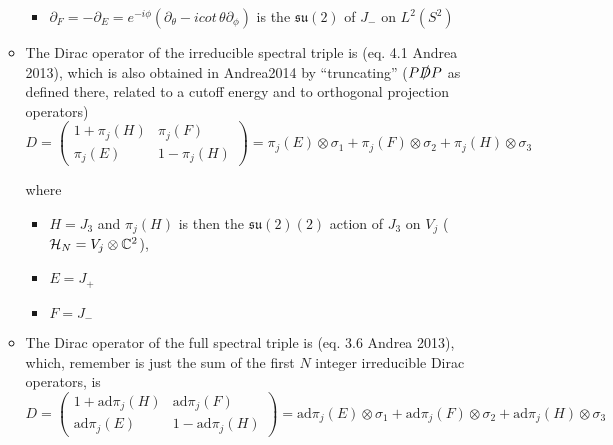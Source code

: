 \documentclass{article}
\newcommand{\sut}{\ensuremath{\mathfrak{su}(2)}}
\begin{document}
\begin{itemize}
\begin{itemize}
\begin{itemize}
            \item $\partial_F = -\partial_E = e^{-i\phi} \left( \partial_\theta - i cot\,\theta \partial_\phi \right)$ is the $\sut$ of $J_-$ on $L^2(S^2)$
            
            \end{itemize}  
        
        \item The Dirac operator of the irreducible spectral triple is (eq. 4.1 Andrea 2013), which is also obtained in Andrea2014 by ``truncating'' ($P\slashed D P$ as defined there, related to a cutoff energy and to orthogonal projection operators)
        \begin{equation}
            D = \begin{pmatrix} 1 + \pi_j(H) & \pi_j(F) \\ \pi_j(E) & 1 - \pi_j(H)\end{pmatrix} = \pi_j(E) \otimes \sigma_1 + \pi_j(F) \otimes \sigma_2 + \pi_j(H) \otimes \sigma_3
        \end{equation}
        
        where 
            \begin{itemize}
            
            \item $H = J_3$ and $\pi_j(H)$ is then the $\sut(2)$ action of $J_3$ on $V_j$ ($\mathcal H_N = V_j \otimes \mathbb{C}^2$),
            
            \item $E = J_+$
            
            \item $F = J_-$
            
            \end{itemize}  
        
        \item The Dirac operator of the full spectral triple is (eq. 3.6 Andrea 2013), which, remember is just the sum of the first $N$ integer irreducible Dirac operators, is 
        \begin{equation}
            D = \begin{pmatrix} 1 + \text{ad}\pi_j(H) & \text{ad}\pi_j(F) \\ \text{ad}\pi_j(E) & 1 - \text{ad}\pi_j(H)\end{pmatrix} = \text{ad}\pi_j(E) \otimes \sigma_1 + \text{ad}\pi_j(F) \otimes \sigma_2 + \text{ad}\pi_j(H) \otimes \sigma_3
        \end{equation}
        

\end{itemize}
\end{itemize}
\end{document}

